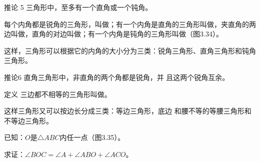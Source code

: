 \begin{Deduction}{推论 5}
三角形中，至多有一个直角或一个钝角。
\end{Deduction}

\begin{Definition} 
每个内角都是锐角的三角形，叫做；有一个内角是直角的三角形叫做，夹直角的两边叫做，直角的对边叫做；有一个内角是钝角的三角形叫做（图3.34）。
\end{Definition}

\begin{figure}
\begin{tikzpicture}
\end{tikzpicture}
    \caption{}
\end{figure}

这样，三角形可以根据它的内角的大小分为三类：锐角三角形、直角三角形和钝角三角形。

\begin{Deduction}
{推论6} 直角三角形中，非直角的两个角都是锐角，并
且这两个锐角互余。
\end{Deduction}

\begin{Definition}
{定义}
三边都不相等的三角形叫做。
\end{Definition}

这样三角形又可以按边长分成三类：等边三角形，底边
和腰不等的等腰三角形和不等边三角形。


\begin{example}
    已知：$O$是$\triangle ABC$内任一点（图3.35）。

求证：$\angle BOC=\angle A+\angle ABO+\angle ACO$。
\end{example}

